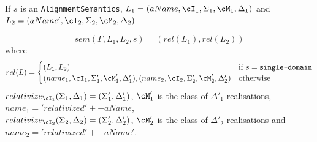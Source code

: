 \documentclass[10pt, a4paper]{isov2}
\newcommand*{\syntax}[1]{\texttt{#1}}
\begin{document}
If $s$ is an \syntax{AlignmentSemantics},
$L_1 = (aName, \cI_1,\Sigma_1,\cM_1,\Delta_1)$
and
$L_2 = (aName', \cI_2,\Sigma_2,\cM_2,\Delta_2)$

$$sem(\Gamma, L_1, L_2, s) = (rel(L_1), rel(L_2))$$
\noindent where $$ rel(L) = \begin{cases}
                                   (L_1,L_2) & \mbox{if } s = \syntax{single-domain}\\
                                   (name_1,\cI_1,\Sigma'_1,\cM'_1,\Delta'_1),
                                   (name_2,\cI_2,\Sigma'_2,\cM'_2,\Delta'_2)& \mbox{otherwise}
                                                                                                                  \end{cases}$$
                                                                                                                  \noindent
$relativize_{\cI_1}(\Sigma_1,\Delta_1) = (\Sigma'_1,\Delta'_1)$,
$\cM'_1$ is the class of $\Delta'_1$-realisations,
$name_1 = 'relativized' ++ aName$,\\
$relativize_{\cI_2}(\Sigma_2,\Delta_2) = (\Sigma'_2,\Delta'_2)$,
$\cM'_2$ is the class of $\Delta'_2$-realisations and
$name_2 = 'relativized'++aName'$.
                                                                                                                   
\end{document}
